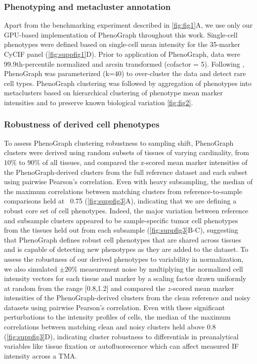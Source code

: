 \documentclass[preprint,review,3p,12pt]{elsarticle}
\begin{document}
\subsubsection{Phenotyping and metacluster annotation}
Apart from the benchmarking experiment described in \autoref{fig:fig1}A, we use only our GPU-based implementation of PhenoGraph throughout this work. Single-cell phenotypes were defined based on single-cell mean intensity for the 35-marker CyCIF panel (\autoref{fig:suppfig1}D). Prior to application of PhenoGraph, data were 99.9th-percentile normalized and arcsin transformed (cofactor = 5). Following \cite{jackson_single-cell_2020}, PhenoGraph was parameterized (k=$40$) to over-cluster the data and detect rare cell types. PhenoGraph clustering was followed by aggregation of phenotypes into metaclusters based on hierarchical clustering of phenotype mean marker intensities and to preserve known biological variation \autoref{fig:fig2}. \\

\subsubsection{Robustness of derived cell phenotypes}
To assess PhenoGraph clustering robustness to sampling shift, PhenoGraph clusters were derived using random subsets of tissues of varying cardinality, from $10\%$ to $90\%$ of all tissues, and compared the z-scored mean marker intensities of the PhenoGraph-derived clusters from the full reference dataset and each subset using pairwise Pearson's correlation. Even with heavy subsampling, the median of the maximum correlations between matching clusters from reference-to-sample comparisons held at ~0.75 (\autoref{fig:suppfig3}A), indicating that we are defining a robust core set of cell phenotypes. Indeed, the major variation between reference and subsample clusters appeared to be sample-specific tumor cell phenotypes from the tissues held out from each subsample (\autoref{fig:suppfig3}B-C), suggesting that PhenoGraph defines robust cell phenotypes that are shared across tissues and is capable of detecting new phenotypes as they are added to the dataset. To assess the robustness of our derived phenotypes to variability in normalization, we also simulated $\pm20\%$ measurement noise by multiplying the normalized cell intensity vectors for each tissue and marker by a scaling factor drawn uniformly at random from the range [0.8,1.2] and compared the $z$-scored mean marker intensities of the PhenoGraph-derived clusters from the clean reference and noisy datasets using pairwise Pearson's correlation. Even with these significant perturbations to the intensity profiles of cells, the median of the maximum correlations between matching clean and noisy clusters held above 0.8 (\autoref{fig:suppfig3}D), indicating cluster robustness to differentials in preanalytical variables like tissue fixation or autofluorescence which can affect measured IF intensity across a TMA.
\end{document}
